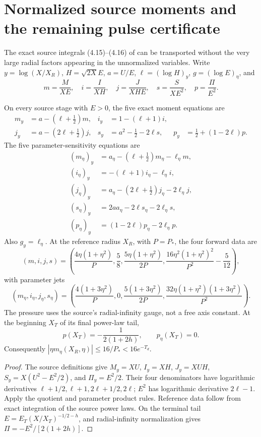 \section{Normalized source moments and the remaining pulse certificate}
The exact source integrals (4.15)--(4.16) of \cite{openai2026} can be
transported without the very large radial factors appearing in the
unnormalized variables. Write $y=\log(X/X_R)$, $H=\sqrt{2X}E$,
$a=U/E$, $\ell=(\log H)_y$, $g=(\log E)_\eta$, and
\[
 m=\frac{M}{XE},\quad i=\frac{I}{XH},\quad
 j=\frac{J}{XHE},\quad s=\frac{S}{XE^2},\quad
 p=\frac{\Pi}{E^2}.
\]
\begin{proposition}
\label{prop:norm-source-ten}
On every source stage with $E>0$, the five exact moment equations are
\[
\begin{aligned}
m_y&=a-(\ell+\tfrac12)m,&i_y&=1-(\ell+1)i,\\
j_y&=a-(2\ell+\tfrac12)j,&
s_y&=a^2-\tfrac12-2\ell s,&
p_y&=\tfrac12+(1-2\ell)p.
\end{aligned}
\]
The five parameter-sensitivity equations are
\[
\begin{aligned}
(m_\eta)_y&=a_\eta-(\ell+\tfrac12)m_\eta-\ell_\eta m,\\
(i_\eta)_y&=-(\ell+1)i_\eta-\ell_\eta i,\\
(j_\eta)_y&=a_\eta-(2\ell+\tfrac12)j_\eta-2\ell_\eta j,\\
(s_\eta)_y&=2aa_\eta-2\ell s_\eta-2\ell_\eta s,\\
(p_\eta)_y&=(1-2\ell)p_\eta-2\ell_\eta p.
\end{aligned}
\]
Also $g_y=\ell_\eta$. At the reference radius $X_R$, with
$P=P_*$, the four forward data are
\[
(m,i,j,s)=\left(\frac{4\eta(1+\eta^2)}P,\frac58,
\frac{5\eta(1+\eta^2)}{2P},
\frac{16\eta^2(1+\eta^2)^2}{P^2}-\frac5{12}\right),
\]
with parameter jets
\[
(m_\eta,i_\eta,j_\eta,s_\eta)=
\left(\frac{4(1+3\eta^2)}P,0,
\frac{5(1+3\eta^2)}{2P},
\frac{32\eta(1+\eta^2)(1+3\eta^2)}{P^2}\right).
\]
The pressure uses the source's radial-infinity gauge, not a free
axis constant. At the beginning $X_T$ of its final power-law tail,
\[
 p(X_T)=-\frac{1}{2(1+2h)},\qquad p_\eta(X_T)=0.
\]
Consequently $|\eta m_\eta(X_R,\eta)|\le16/P_*<16e^{-T_d}$.
\end{proposition}
\begin{proof}
The source definitions give
$M_y=XU$, $I_y=XH$, $J_y=XUH$,
$S_y=X(U^2-E^2/2)$, and $\Pi_y=E^2/2$.
Their four denominators have logarithmic derivatives
$\ell+1/2,\ell+1,2\ell+1/2,2\ell$; $E^2$ has logarithmic
derivative $2\ell-1$. Apply the quotient and parameter
product rules. Reference data follow from exact integration of
the source power laws. On the terminal tail
$E=E_T(X/X_T)^{-1/2-h}$, and radial-infinity normalization
gives $\Pi=-E^2/[2(1+2h)]$.
\end{proof}

